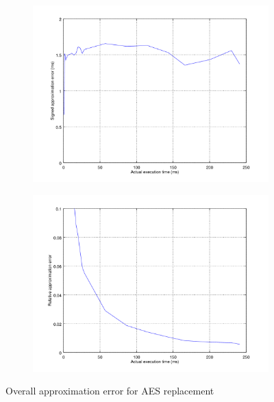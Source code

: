 \begin{figure}[ht!]
	\center
	\begin{subfigure}{0.45\linewidth}
		\center
		\includegraphics[width=1\linewidth]{fig/esterraes.png}
	\end{subfigure}
	\begin{subfigure}{0.45\linewidth}
		\center
		\includegraphics[width=\linewidth]{fig/rtvesterraes.png}
	\end{subfigure}
	\caption{Overall approximation error for AES replacement}
	\label{Fig: Overall estimation error for AES replacement}
\end{figure}

